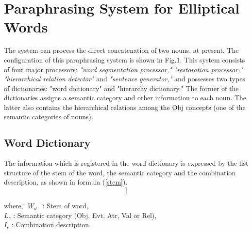 \section{Paraphrasing System for Elliptical Words}
The system can process the direct concatenation of two nouns, at
present. The configuration of this paraphrasing system is shown in
Fig.1. This system consists of four major processors: {\it "word
segmentation processor," "restoration processor," "hierarchical
relation detector"} and {\it "sentence generator,"} and possesses two
types of dictionaries: "word dictionary" and "hierarchy dictionary."
The former of the dictionaries assigns a semantic category and other
information to each noun. The latter also contains the hierarchical
relations among the Obj concepts (one of the semantic categories of
nouns).

\subsection{Word Dictionary}
The information which is registered in the word dictionary is
expressed by the list structure of the stem of the word, the semantic
category and the combination description, as shown in formula
(\ref{stem}).
\begin{equation}
         [W_d, [L_c, I_c]] \label{stem}
\end{equation}
\begin{tabbing}
 where,  \= $W_d$ \ \= : Stem of word,\\
         \> $L_c$ \> : Semantic category (Obj, Evt, Atr, Val or Rel),\\
         \> $I_c$ \> : Combination description. 
\end{tabbing}

